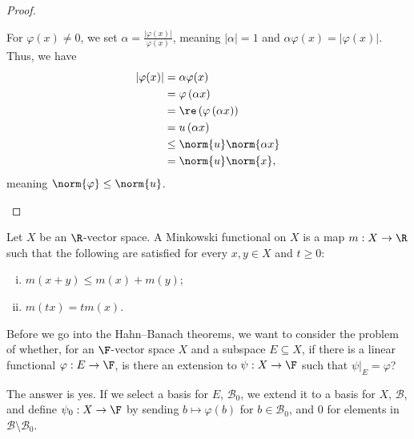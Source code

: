 \documentclass[10pt]{mypackage}
\begin{document}
\begin{proof}
\begin{enumerate}[(1)]
        For $\varphi(x) \neq 0$, we set $\alpha = \frac{\left\vert \varphi(x) \right\vert}{\varphi(x)}$, meaning $\left\vert \alpha \right\vert = 1$ and $\alpha\varphi(x) = \left\vert \varphi(x) \right\vert$. Thus, we have
        \begin{align*}
          \left\vert \varphi(x) \right\vert &= \alpha\varphi(x)\\
                                            &= \varphi\left(\alpha x\right)\\
                                            &= \re\left(\varphi\left(\alpha x\right)\right)\\
                                            &= u\left(\alpha x\right)\\
                                            &\leq \norm{u}\norm{\alpha x}\\
                                            &= \norm{u}\norm{x},
        \end{align*}
        meaning $\norm{\varphi}\leq \norm{u}$.
    \end{enumerate}
  \end{proof}
  \begin{definition}
  Let $X$ be an $\R$-vector space. A Minkowski functional on $X$ is a map $m: X\rightarrow \R$ such that the following are satisfied for every $x,y\in X$ and $t\geq 0$:
  \begin{enumerate}[(i)]
    \item $m\left(x+y\right)\leq m(x) + m(y)$;
    \item $m\left(tx\right) = tm(x)$.
  \end{enumerate}
  \end{definition}
  Before we go into the Hahn--Banach theorems, we want to consider the problem of whether, for an $\F$-vector space $X$ and a subspace $E\subseteq X$, if there is a linear functional $\varphi: E\rightarrow \F$, is there an extension to $\psi: X\rightarrow \F$ such that $\psi|_{E} = \varphi$?\newline

  The answer is yes. If we select a basis for $E$, $\mathcal{B}_0$, we extend it to a basis for $X$, $\mathcal{B}$, and define $\psi_0: X\rightarrow \F$ by sending $b\mapsto \varphi(b)$ for $b\in \mathcal{B}_{0}$, and $0$ for elements in $\mathcal{B}\setminus \mathcal{B}_0$.\newline
\end{document}
